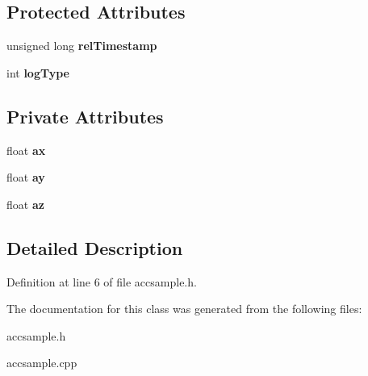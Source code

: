 \subsection*{Protected Attributes}
\begin{DoxyCompactItemize}
\item 
\hypertarget{class_sample_a24ea733ab0a815949a57aca2a4740e33}{unsigned long {\bfseries rel\-Timestamp}}\label{class_sample_a24ea733ab0a815949a57aca2a4740e33}

\item 
\hypertarget{class_sample_a3a6454628c790459f41de5c83bf3ec7c}{int {\bfseries log\-Type}}\label{class_sample_a3a6454628c790459f41de5c83bf3ec7c}

\end{DoxyCompactItemize}
\subsection*{Private Attributes}
\begin{DoxyCompactItemize}
\item 
\hypertarget{class_acc_sample_a0971152a4b39e44f004fb3d617c0a285}{float {\bfseries ax}}\label{class_acc_sample_a0971152a4b39e44f004fb3d617c0a285}

\item 
\hypertarget{class_acc_sample_a1fd5b59dc902551e02efc4fe2c83695e}{float {\bfseries ay}}\label{class_acc_sample_a1fd5b59dc902551e02efc4fe2c83695e}

\item 
\hypertarget{class_acc_sample_a332097e8c2743fa40a586a50efdb7efe}{float {\bfseries az}}\label{class_acc_sample_a332097e8c2743fa40a586a50efdb7efe}

\end{DoxyCompactItemize}


\subsection{Detailed Description}


Definition at line 6 of file accsample.\-h.



The documentation for this class was generated from the following files\-:\begin{DoxyCompactItemize}
\item 
accsample.\-h\item 
accsample.\-cpp\end{DoxyCompactItemize}
